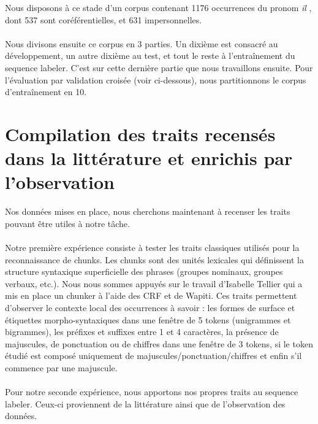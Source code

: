 \documentclass[a4paper,12pt]{article}
\begin{document}
Nous disposons à ce stade d'un corpus contenant 1176 occurrences du pronom \og \textit{il} \fg{}, dont 537 sont coréférentielles, et 631 impersonnelles.

\paragraph{}
Nous divisons ensuite ce corpus en 3 parties. Un dixième est consacré au développement, un autre dixième au test, et tout le reste à l'entraînement du sequence labeler. C'est sur cette dernière partie que nous travaillons ensuite. Pour l'évaluation par validation croisée (voir ci-dessous), nous partitionnons le corpus d'entraînement en 10.

\section{Compilation des traits recensés dans la littérature et enrichis par l'observation}

Nos données mises en place, nous cherchons maintenant à recenser les traits pouvant être utiles à notre tâche.

\paragraph{}
Notre première expérience consiste à tester les traits classiques utilisés pour la reconnaissance de chunks. Les chunks sont des unités lexicales qui définissent la structure syntaxique superficielle des phrases (groupes nominaux, groupes verbaux, etc.). Nous nous sommes appuyés sur le travail d'Isabelle Tellier qui a mis en place un chunker à l'aide des CRF et de Wapiti\cite{constant:integrer:taln11}. Ces traits permettent d'observer le contexte local des occurrences à savoir : les formes de surface et étiquettes morpho-syntaxiques dans une fenêtre de 5 tokens (unigrammes et bigrammes), les préfixes et suffixes entre 1 et 4 caractères, la présence de majuscules, de ponctuation ou de chiffres dans une fenêtre de 3 tokens, si le token étudié est composé uniquement de majuscules/ponctuation/chiffres et enfin s'il commence par une majuscule.

\paragraph{}
Pour notre seconde expérience, nous apportons nos propres traits au sequence labeler. Ceux-ci proviennent de la littérature ainsi que de l'observation des données.
\end{document}
